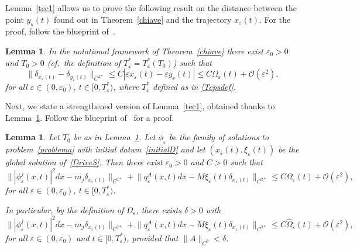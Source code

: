\documentclass[11pt]{amsart}
\numberwithin{equation}{section}
\newtheorem{lemma}[theorem]{Lemma}
\theoremstyle{definition}
\begin{document}
\vskip4pt
\noindent
Lemma~\ref{tec1} allows us to prove the following result
on the distance between the point $y_{\varepsilon}(t)$ found
out in Theorem~\ref{chiave} and the trajectory $x_{\varepsilon}(t)$. For the proof,
follow the blueprint of~\cite[Lemma~6.3]{squa}.

\begin{lemma}\label{lemmaT0}
    In the notational framework of Theorem~\ref{chiave} there exist ${\varepsilon}_0>0$ and $T_0>0$ (cf.~the
    definition of $T_{\varepsilon}^{*}=T_{\varepsilon}^{*}(T_0)$) such that
$$
\big\|\delta_{x_{\varepsilon}(t)}-\delta_{y_{\varepsilon}(t)}\big\|_{C^{2*}}\leq
C|{\varepsilon} x_{\varepsilon}(t)-{\varepsilon} y_{\varepsilon}(t)|\leq C\Omega_{\varepsilon}(t)+{\mathcal O}({\varepsilon}^2),
$$
for all ${\varepsilon}\in(0,{\varepsilon}_{0})$, $t\in [0,T_{\varepsilon}^{*})$,
where $T_{\varepsilon}^{*}$ defined as in \eqref{Tepsdef}.
\end{lemma}

\noindent
Next, we state a strengthened version of
Lemma~\ref{tec1}, obtained thanks to Lemma~\ref{lemmaT0}. Follow
the blueprint of~\cite[Lemma~6.4]{squa} for a proof.

\begin{lemma}\label{lemmaT0+}
    Let $T_0$ be as in Lemma~\ref{lemmaT0}.
Let $\phi_{\varepsilon}$ be the family of solutions to
problem~\eqref{problema} with initial datum~\eqref{initialD} and let
$(x_{\varepsilon}(t), \xi_{\varepsilon}(t))$ be the global solution of~\eqref{DriveS}.
Then there exist ${\varepsilon}_{0}>0$ and $C>0$ such that
\begin{equation*}
\big\| |\phi_{\varepsilon}^j(x,t)|^2dx-m_j\delta_{x_{\varepsilon}(t)}\big\|_{C^{2*}}
+
\big\|q_{\varepsilon}^{A}(x,t)dx-M\xi_{\varepsilon}(t)\delta_{x_{\varepsilon}(t)}\big\|_{C^{2*}}\leq
C\Omega_{\varepsilon}(t)+{\mathcal O}({\varepsilon}^2),
\end{equation*}
for all ${\varepsilon}\in(0,{\varepsilon}_{0})$, $t\in [0,T_{\varepsilon}^{*})$.

\noindent
In particular, by the definition
of $\Omega_{\varepsilon}$, there exists $\delta>0$ with
\begin{equation}
	\label{secDDIn}
\big\| |\phi_{\varepsilon}^j(x,t)|^2dx-m_j\delta_{x_{\varepsilon}(t)}\big\|_{C^{2*}}
+
\big\|q_{\varepsilon}^{A}(x,t)dx-M\xi_{\varepsilon}(t)\delta_{x_{\varepsilon}(t)}\big\|_{C^{2*}}\leq
C\hat\Omega_{\varepsilon}(t)+{\mathcal O}({\varepsilon}^2),
\end{equation}
for all ${\varepsilon}\in(0,{\varepsilon}_{0})$ and $t\in [0,T_{\varepsilon}^{*})$, provided that $\|A\|_{C^2}<\delta$.
\end{lemma}
\end{document}
